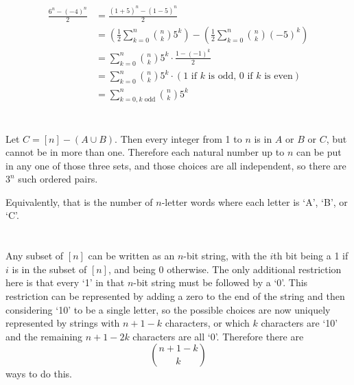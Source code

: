 \documentclass[12pt]{article}
\begin{document}
\section{}
\noindent{}\bigskip\par
\begin{align*}
    \frac{6^n-(-4)^n}{2} &= \frac{(1+5)^n - (1-5)^n}{2} \\
                         &= \left( \frac{1}{2} \sum_{k=0}^n \binom{n}{k} 5^k \right) - \left( \frac{1}{2} \sum_{k=0}^n \binom{n}{k} (-5)^k \right) \\
                         &= \sum_{k=0}^n \binom{n}{k} 5^k \cdot \frac{1-(-1)^k}{2} \\
                         &= \sum_{k=0}^n \binom{n}{k} 5^k \cdot \left(\text{1 if $k$ is odd, 0 if $k$ is even}\right) \\
                         &= \sum_{k=0,k \text{ odd}}^n \binom{n}{k} 5^k
\end{align*}

\section{}
\noindent{}\bigskip\par
Let $C=[n]-(A \cup B)$. Then every integer from 1 to $n$ is in $A$ or $B$ or $C$, but cannot be in more than one. Therefore each natural number up to $n$ can be put in any one of those three sets, and those choices are all independent, so there are $3^n$ such ordered pairs.
\par
Equivalently, that is the number of $n$-letter words where each letter is `A', `B', or `C'.

\section{}
\noindent{}\bigskip\par

Any subset of $[n]$ can be written as an $n$-bit string, with the $i$th bit being a 1 if $i$ is in the subset of $[n]$, and being 0 otherwise. The only additional restriction here is that every `1' in that $n$-bit string must be followed by a `0'. This restriction can be represented by adding a zero to the end of the string and then considering `10' to be a single letter, so the possible choices are now uniquely represented by strings with $n+1-k$ characters, or which $k$ characters are `10' and the remaining $n+1-2k$ characters are all `0'. Therefore there are
\[ \binom{n+1-k}{k} \]
ways to do this.
\end{document}
